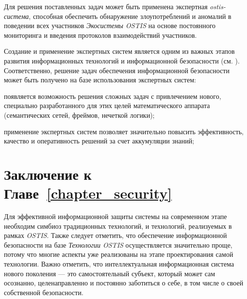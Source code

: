 Для решения поставленных задач может быть применена экспертная \textit{ostis-система}, способная обеспечить обнаружение злоупотреблений и аномалий в поведении всех участников \textit{Экосистемы OSTIS} на основе постоянного мониторинга и введения протоколов взаимодействий участников.

Создание и применение экспертных систем является одним из важных этапов развития информационных технологий и информационной безопасности (см. ). Соответственно, решение задач обеспечения информационной безопасности может быть получено на базе использования экспертных систем:

\begin{textitemize}
	\item появляется возможность решения сложных задач с привлечением нового, специально разработанного для этих целей математического аппарата (семантических сетей, фреймов, нечеткой логики);
	\item применение экспертных систем позволяет значительно повысить эффективность, качество и оперативность решений за счет аккумуляции знаний;
\end{textitemize}

\section*{Заключение к Главе~\ref{chapter_security}}
Для эффективной информационной защиты системы на современном этапе необходим симбиоз традиционных технологий, и технологий, реализуемых в рамках \textit{OSTIS}. Также следует отметить, что обеспечение информационной безопасности на базе \textit{Технологии OSTIS} осуществляется значительно проще, потому что многие аспекты уже реализованы на этапе проектирования самой технологии. Важно отметить, что интеллектуальная информационная система нового поколения --- это самостоятельный субъект, который может сам осознанно, целенаправленно и постоянно заботиться о себе, в том числе о своей собственной безопасности.


%